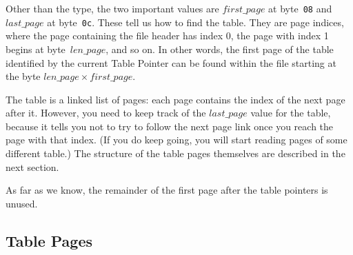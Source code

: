 \documentclass[11pt]{article}
\begin{document}
Other than the type, the two important values are $first\_page$ at
byte~{\tt 08} and $last\_page$ at byte~{\tt 0c}. These tell us how to
find the table. They are page indices, where the page containing the
file header has index 0, the page with index 1 begins at
byte~$len\_page$, and so on. In other words, the first page of the
table identified by the current Table Pointer can be found within the
file starting at the byte $len\_page \times first\_page$.

The table is a linked list of pages: each page contains the index of
the next page after it. However, you need to keep track of the
$last\_page$ value for the table, because it tells you not to try to
follow the next page link once you reach the page with that index. (If
you do keep going, you will start reading pages of some different
table.) The structure of the table pages themselves are described
in the next section.

As far as we know, the remainder of the first page after the table
pointers is unused.


\subsection{Table Pages}
\end{document}
